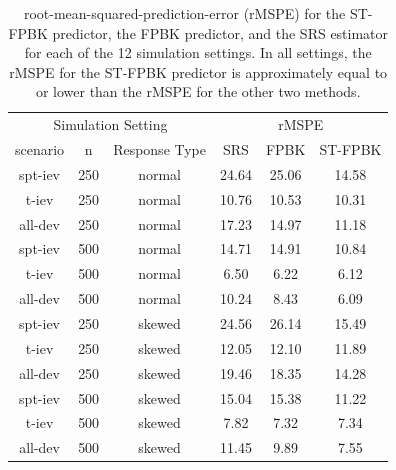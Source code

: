 \documentclass[]{article}    %
\begin{document}
\begin{table}[H]

\caption{\label{tab:simrmspetab}root-mean-squared-prediction-error (rMSPE) for the ST-FPBK predictor, the FPBK predictor, and the SRS estimator for each of the 12 simulation settings. In all settings, the rMSPE for the ST-FPBK predictor is approximately equal to or lower than the rMSPE for the other two methods.}
\centering
\begin{tabular}[t]{cccccc}
\toprule
\multicolumn{3}{c}{Simulation Setting} & \multicolumn{3}{c}{rMSPE} \\
\cmidrule(l{3pt}r{3pt}){1-3} \cmidrule(l{3pt}r{3pt}){4-6}
scenario & n & Response Type & SRS & FPBK & ST-FPBK\\
\midrule
spt-iev & 250 & normal & 24.64 & 25.06 & 14.58\\
t-iev & 250 & normal & 10.76 & 10.53 & 10.31\\
all-dev & 250 & normal & 17.23 & 14.97 & 11.18\\
\midrule
spt-iev & 500 & normal & 14.71 & 14.91 & 10.84\\
t-iev & 500 & normal & 6.50 & 6.22 & 6.12\\
all-dev & 500 & normal & 10.24 & 8.43 & 6.09\\
\midrule
spt-iev & 250 & skewed & 24.56 & 26.14 & 15.49\\
t-iev & 250 & skewed & 12.05 & 12.10 & 11.89\\
all-dev & 250 & skewed & 19.46 & 18.35 & 14.28\\
\midrule
spt-iev & 500 & skewed & 15.04 & 15.38 & 11.22\\
t-iev & 500 & skewed & 7.82 & 7.32 & 7.34\\
all-dev & 500 & skewed & 11.45 & 9.89 & 7.55\\
\bottomrule
\end{tabular}
\end{table}
\end{document}
